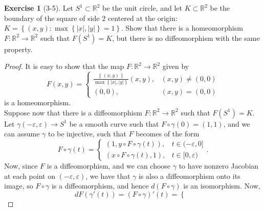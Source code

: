 \documentclass[reqno]{amsart}
\theoremstyle{plain}%
\theoremstyle{definition}
\newtheorem{exercise}[theorem]{Exercise}
\theoremstyle{remark}
\begin{document}
    \begin{exercise}[3-5]
        Let $S^{1} \subset \mathbb{R}^2$ be the unit circle, and let
        $K \subset \mathbb{R}^2$ be the boundary of the square of side
        $2$ centered at the origin:
        $K = \left\{ \left( x,y \right)  \colon \max \left\{ 
        \left| x \right| , \left| y \right| \right\} =1 \right\} $. Show
        that there is a homeomorphism $F  \colon \mathbb{R}^2 \to \mathbb{R}^2$ 
        such that $F\left( S^{1} \right) = K$, but there is no diffeomorphism
        with the same property.
    \end{exercise}

    \begin{proof}
        It is easy to show that the map
        $F  \colon \mathbb{R}^2 \to \mathbb{R}^2$ given by
        \[
        F(x,y) = 
        \begin{cases}
            \frac{\|(x,y)\|}{\max \left\{ \left| x \right| ,\left| y \right|  \right\} }
            (x,y),& (x,y) \neq (0,0)\\
            (0,0),& (x,y) = (0,0)
        \end{cases}
        \] 
        is a homeomorphism.\\
        \linebreak
        Suppose now that there is a diffeomorphism $F  \colon \mathbb{R}^2 \to
        \mathbb{R}^2$ such that
        $F\left( S^{1} \right) = K$. Let $\gamma \left( - \varepsilon, \varepsilon \right) 
        \to S^{1}$ be a smooth curve such that $F \circ \gamma(0) = (1,1)$, and
        we can assume $\gamma$ to be injective, such that $F$ becomes of the
        form
        \[
        F \circ \gamma(t) =
        \begin{cases}
            \left( 1, y  \circ F \circ \gamma (t) \right) , & t \in
            (-\varepsilon,0]\\
            (x \circ F \circ \gamma(t), 1) , & t \in [0, \varepsilon)
        \end{cases}.
        \] 
        Now, since $F$ is a diffeomorphism, and we can choose
        $\gamma$ to have nonzero Jacobian at each point on
        $\left( -\varepsilon, \varepsilon \right) $, we have that
        $\gamma$ is also a diffeomorphism onto its image, so
        $F \circ \gamma$ is a diffeomorphism, and hence
        $d \left( F \circ \gamma \right) $ is an isomorphism.
        Now,
        \[
        dF \left( \gamma'(t) \right) =
        \left( F \circ \gamma \right)'(t) =
        \begin{cases}

\end{cases}\]
\end{proof}
\end{document}
